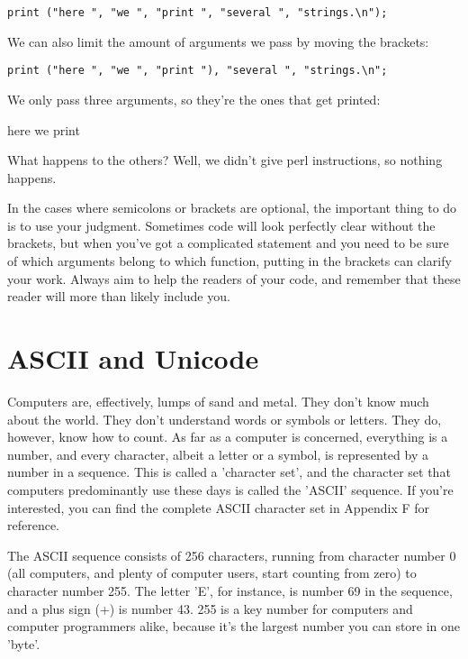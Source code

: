 \documentclass[a4paper,11pt]{book}
\begin{document}
\noindent 

\noindent \texttt{print ("here ", "we ", "print ", "several ", "strings.\textbackslash n");}

\noindent 

\noindent We can also limit the amount of arguments we pass by moving the brackets:

\noindent 

\noindent \texttt{print ("here ", "we ", "print "), "several ", "strings.\textbackslash n";}

\noindent 

\noindent We only pass three arguments, so they're the ones that get printed:

\noindent 

\noindent here we print

\noindent 

\noindent What happens to the others? Well, we didn't give perl instructions, so nothing happens.

\noindent 

\noindent In the cases where semicolons or brackets are optional, the important thing to do is to use your judgment. Sometimes code will look perfectly clear without the brackets, but when you've got a complicated statement and you need to be sure of which arguments belong to which function, putting in the brackets can clarify your work. Always aim to help the readers of your code, and remember that these reader will more than likely include you.

\noindent 

\section{ASCII and Unicode}

\noindent 

\noindent Computers are, effectively, lumps of sand and metal. They don't know much about the world. They don't understand words or symbols or letters. They do, however, know how to count. As far as a computer is concerned, everything is a number, and every character, albeit a letter or a symbol, is represented by a number in a sequence. This is called a 'character set', and the character set that computers predominantly use these days is called the 'ASCII' sequence. If you're interested, you can find the complete ASCII character set in Appendix F for reference.

\noindent 

\noindent The ASCII sequence consists of 256 characters, running from character number 0 (all computers, and plenty of computer users, start counting from zero) to character number 255. The letter 'E', for instance, is number 69 in the sequence, and a plus sign (+) is number 43. 255 is a key number for computers and computer programmers alike, because it's the largest number you can store in one 'byte'.
\end{document}
